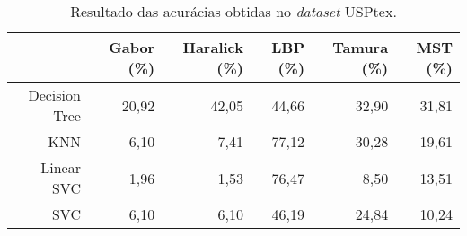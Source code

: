 \begin{table}[H]
    \centering
    \caption[Resultado das acurácias obtidas no USPtex]{Resultado das acurácias obtidas no \textit{dataset} USPtex.
    \label{tab:USPtexAcuracias}}
    \begin{tabular}{rrrrrr}
        \toprule
            & Gabor (\%) & Haralick (\%) & LBP (\%) & Tamura (\%) & MST (\%) \\
        \midrule
            Decision Tree & 20,92 & 42,05 & 44,66 & 32,90 & 31,81 \\
            KNN & 6,10 & 7,41 & 77,12 & 30,28 & 19,61 \\
            Linear SVC & 1,96 & 1,53 & 76,47 & 8,50 & 13,51 \\
            SVC & 6,10 & 6,10 & 46,19 & 24,84 & 10,24 \\
        \bottomrule
    \end{tabular}
\end{table}

